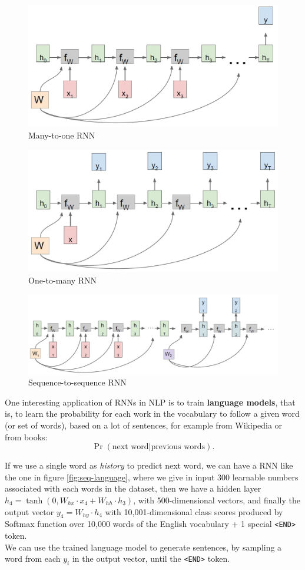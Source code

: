 \begin{figure}[h!]
    \centering
    \includegraphics[width=0.6\linewidth]{images/seq-many-one}
    \caption[Many-to-one RNN]{Many-to-one RNN}
    \label{fig:seq-many-one}
\end{figure}

\begin{figure}[h!]
    \centering
    \includegraphics[width=0.6\linewidth]{images/seq-one-many}
    \caption[One-to-many RNN]{One-to-many RNN}
    \label{fig:seq-one-many}
\end{figure}

\begin{figure}[h!]
    \centering
    \includegraphics[width=0.6\linewidth]{images/seq-seq-seq-rnn}
    \caption[Sequence-to-sequence RNN]{Sequence-to-sequence RNN}
    \label{fig:seq-seq-seq}
\end{figure}

One interesting application of RNNs in NLP is to train \textbf{language models}, that is, to learn the probability for each work in the vocabulary to follow a given word (or set of words), based on a lot of sentences, for example from Wikipedia or from books:
\begin{equation}\label{eq:language-model}
    \Pr(\text{next word} | \text{previous words}).
\end{equation}

If we use a single word as \textit{history} to predict next word, we can have a RNN like the one in figure \ref{fig:seq-language}, where we give in input 300 learnable numbers associated with each words in the dataset, then we have a hidden layer $h_4 = \tanh(0, W_{hx} \cdot x_4 + W_{hh} \cdot h_3)$,  with 500-dimensional vectors, and finally the output vector $y_4 = W_{hy} \cdot h_4$ with 10,001-dimensional class scores produced by Softmax function over 10,000 words of the English vocabulary + 1 special \texttt{<END>} token.\\
We can use the trained language model to generate sentences, by sampling a word from each $y_i$ in the output vector, until the \texttt{<END>} token.

